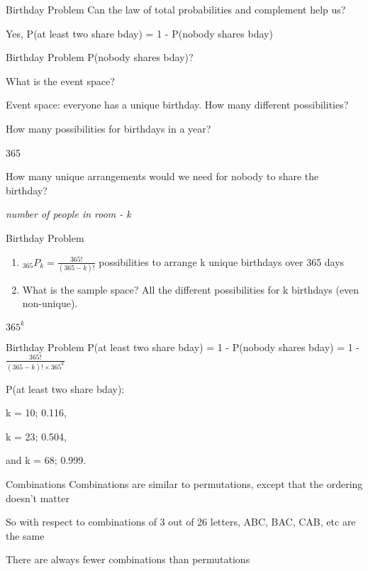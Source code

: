 \documentclass[presentation]{beamer}
\begin{document}
\begin{frame}[label={sec:orgd9bba19}]{Birthday Problem}
Can the law of total probabilities and complement help us?

\pause

Yes, P(at least two share bday) = 1 - P(nobody shares bday)
\end{frame}

\begin{frame}[label={sec:org01d414d}]{Birthday Problem}
P(nobody shares bday)?

What is the event space?

\pause

Event space:  everyone has a unique birthday. How many different possibilities?

\pause

How many possibilities for birthdays in a year?

\pause

365

\pause

How many unique arrangements would we need for nobody to share the birthday?

\emph{number of people in room - k}
\end{frame}

\begin{frame}[label={sec:org1536067}]{Birthday Problem}
\begin{enumerate}
\item \(_{365}P_{k} = \frac{365!}{(365-k)!}\) possibilities to arrange k unique birthdays over 365 days

\item What is the sample space? \alert{All the different possibilities for k birthdays (even non-unique).}
\end{enumerate}

\pause
\(365^{k}\)
\end{frame}

\begin{frame}[label={sec:orgedccec9}]{Birthday Problem}
P(at least two share bday) = 1 - P(nobody shares bday) = 1 - \(\frac{365!}{(365-k)! \times 365^{k}}\)

\pause

P(at least two share bday):

k = 10; 0.116,

k = 23; 0.504,

and k = 68; 0.999.
\end{frame}


\begin{frame}[label={sec:orgfa5f45a}]{Combinations}
Combinations are similar to permutations, except that the ordering doesn't matter

So with respect to combinations of 3 out of 26 letters, ABC, BAC, CAB, etc are the same

\pause

There are \alert{always} fewer combinations than permutations
\end{frame}
\end{document}
